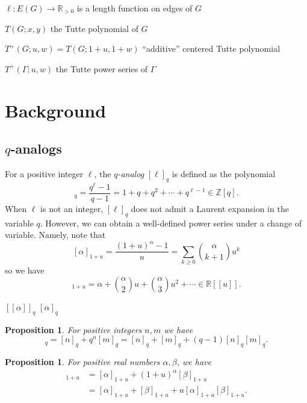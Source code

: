 \documentclass{amsart}
\newtheorem{prop}[thm]{Proposition}
\theoremstyle{definition}
\newcommand{\RR}{\mathbb{R}}
\newcommand{\ZZ}{\mathbb{Z}}
\newcommand{\fanalog}[2]{[[#2]]_{#1}}
\newcommand{\analog}[2]{[#2]_{#1}}
\begin{document}
$\ell : E(G) \to \RR_{>0}$
is a length function on edges of $G$

$T(G; x,y)$ the Tutte polynomial of $G$

$T^+(G; u,w) = T(G; 1+u,1+w)$ ``additive'' centered Tutte polynomial

$T^+(\Gamma; u,w)$ the Tutte power series of $\Gamma$




\section{Background}

\subsection{$q$-analogs}
For a positive integer $\ell$,
the {\em $q$-analog}
$[\ell]_q$ is defined as
the polynomial
\begin{equation*}
[\ell]_q = \frac{q^\ell - 1}{q - 1}
= 1 + q + q^2 + \cdots + q^{\ell -1} 
\in \ZZ[q].
\end{equation*}
When $\ell$ is not an integer, 
$[\ell]_q$ does not admit a Laurent expansion in the variable $q$.
However, we can obtain a well-defined power series under a change of variable.
Namely, note that
\[ [\alpha]_{1+u} = \frac{(1+u)^\alpha - 1}{u}
= \sum_{k \geq 0} \binom{\alpha}{k+1}u^{k} 
\]
so we have 
\begin{equation}
[\alpha]_{1+u} = \alpha + \binom{\alpha}{2} u + \binom{\alpha}{3} u^2 + \cdots
\in \RR[[u]] .
\end{equation}

$\fanalog{q}{\alpha}$
$\analog{q}{\alpha}$

\begin{prop}
For positive integers $n,m$ we have
\begin{equation*}
[n + m]_q =  [n ]_q + q^{n} [m]_q
 = [n]_q + [m]_q + (q-1) [n]_q [m]_q .
\end{equation*}
\end{prop}
\begin{prop}
For positive real numbers $\alpha,\beta$, we have
\begin{align*}
[\alpha + \beta]_{1+u} &=  [\alpha]_{1+u} + (1+u)^{\alpha} [\beta]_{1+u} \\
 &= [\alpha]_{1+u} + [\beta]_{1+u} + u [\alpha]_{1+u} [\beta]_{1+u}.
\end{align*}
\end{prop}
\end{document}
